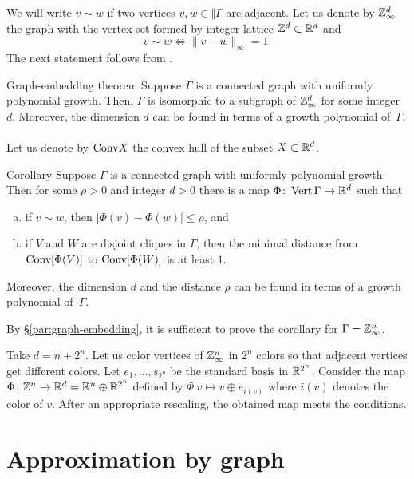 \arxiv{\documentclass[a4paper,10pt]{article}}{\documentclass{mjm}}
\begin{document}
We will write $v\sim w$ if two vertices $v,w\in \Vert \Gamma$ are adjacent.
Let us denote by $\mathbb{Z}^d_\infty$ the graph with the vertex set formed by integer lattice $\mathbb{Z}^d\subset \mathbb{R}^d$ and
\[v\sim w \iff  \|v-w\|_\infty=1.\]
The next statement follows from \cite[Theorem 5.5]{krauthgamer-lee1}.

\begin{thm}{Graph-embedding theorem}\label{thm:graph-embedding}
Suppose $\Gamma$ is a connected graph with uniformly polynomial growth.
Then, $\Gamma$ is isomorphic to a subgraph of $\mathbb{Z}^d_\infty$ for some integer~$d$.
Moreover, the dimension $d$ can be found in terms of a growth polynomial of~$\Gamma$.
\end{thm}

\paragraph{}\label{par:Phi}
Let us denote by $\text{\rm Conv} X$ the convex hull of the subset $X\subset \mathbb{R}^d$.

\begin{thm}{Corollary}\label{cor:graph-embedding}
Suppose $\Gamma$ is a connected graph with uniformly polynomial growth.
Then for some $\rho>0$ and integer $d>0$ there is a map $\Phi\colon\mathop{\rm Vert} \Gamma\to \mathbb{R}^d$ such that
\begin{enumerate}[(a)]
\item if $v\sim w$, then $|\Phi(v)-\Phi(w)|\le \rho$, and 
\item if $V$ and $W$ are disjoint cliques in $\Gamma$, then the minimal distance from $\text{\rm Conv}[\Phi(V)]$ to $\text{\rm Conv}[\Phi(W)]$ is at least $1$.
\end{enumerate}
Moreover, the dimension $d$ and the distance $\rho$ can be found in terms of a growth polynomial of~$\Gamma$.
\end{thm}

By §\ref{par:graph-embedding}, it is sufficient to prove the corollary for $\Gamma=\mathbb{Z}^n_\infty$.

Take $d=n+2^n$.
Let us color vertices of $\mathbb{Z}^n_\infty$ in $2^n$ colors so that adjacent vertices get different colors.
Let $e_1,\dots,s_{2^n}$ be the standard basis in $\mathbb{R}^{2^n}$.
Consider the map $\Phi\colon\mathbb{Z}^n\to \mathbb{R}^d=\mathbb{R}^n\oplus \mathbb{R}^{2^n}$ defined by $\Phi\:v\mapsto v\oplus e_{i(v)}$ where $i(v)$ denotes the color of $v$.
After an appropriate rescaling, the obtained map meets the conditions.
\qeds

\section*{Approximation by graph}
\end{document}
